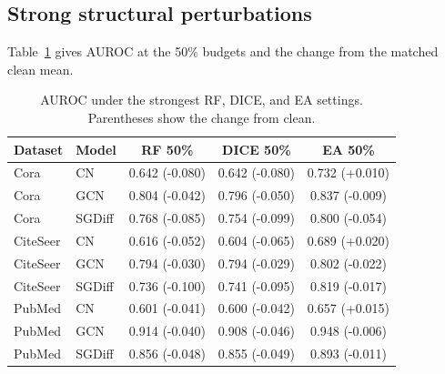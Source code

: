 \subsection{Strong structural perturbations}
Table~\ref{tab:strong} gives AUROC at the 50\% budgets and the change from the matched clean mean.
\begin{table}[H]
\centering
\small
\begin{tabular}{llccc}
\toprule
Dataset & Model & RF 50\% & DICE 50\% & EA 50\% \\
\midrule
Cora & CN & 0.642 (-0.080) & 0.642 (-0.080) & 0.732 (+0.010) \\
Cora & GCN & 0.804 (-0.042) & 0.796 (-0.050) & 0.837 (-0.009) \\
Cora & SGDiff & 0.768 (-0.085) & 0.754 (-0.099) & 0.800 (-0.054) \\
\addlinespace
CiteSeer & CN & 0.616 (-0.052) & 0.604 (-0.065) & 0.689 (+0.020) \\
CiteSeer & GCN & 0.794 (-0.030) & 0.794 (-0.029) & 0.802 (-0.022) \\
CiteSeer & SGDiff & 0.736 (-0.100) & 0.741 (-0.095) & 0.819 (-0.017) \\
\addlinespace
PubMed & CN & 0.601 (-0.041) & 0.600 (-0.042) & 0.657 (+0.015) \\
PubMed & GCN & 0.914 (-0.040) & 0.908 (-0.046) & 0.948 (-0.006) \\
PubMed & SGDiff & 0.856 (-0.048) & 0.855 (-0.049) & 0.893 (-0.011) \\
\bottomrule
\end{tabular}
\caption{AUROC under the strongest RF, DICE, and EA settings. Parentheses show the change from clean.}
\label{tab:strong}
\end{table}
